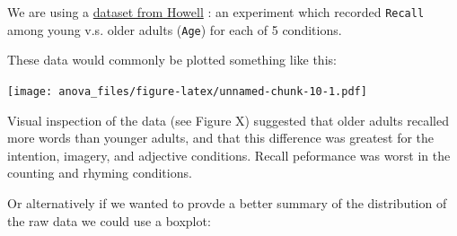 \documentclass[]{article}
\newenvironment{Shaded}{\begin{snugshade}}{\end{snugshade}}
\newcommand{\DataTypeTok}[1]{\textcolor[rgb]{0.13,0.29,0.53}{#1}}
\newcommand{\DecValTok}[1]{\textcolor[rgb]{0.00,0.00,0.81}{#1}}
\newcommand{\KeywordTok}[1]{\textcolor[rgb]{0.13,0.29,0.53}{\textbf{#1}}}
\newcommand{\NormalTok}[1]{#1}
\newcommand{\OperatorTok}[1]{\textcolor[rgb]{0.81,0.36,0.00}{\textbf{#1}}}
\newcommand{\StringTok}[1]{\textcolor[rgb]{0.31,0.60,0.02}{#1}}
\begin{document}
We are using a
\href{http://www.uvm.edu/~dhowell/methods7/DataFiles/Tab13-2.dat}{dataset from Howell}
\citep[chapter 13]{howell2012statistical}: an experiment which recorded \texttt{Recall}
among young v.s. older adults (\texttt{Age}) for each of 5 conditions.

These data would commonly be plotted something like this:

\begin{Shaded}
\end{Shaded}

\texttt{[image: anova\_files/figure-latex/unnamed-chunk-10-1.pdf]}

{Visual inspection of the data (see Figure X) suggested that older adults
recalled more words than younger adults, and that this difference was greatest
for the intention, imagery, and adjective conditions. Recall peformance was
worst in the counting and rhyming conditions.}

Or alternatively if we wanted to provde a better summary of the distribution of
the raw data we could use a boxplot:

\begin{Shaded}
\end{Shaded}
\end{document}
